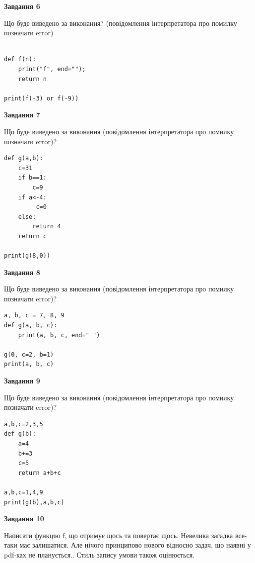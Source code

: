\documentclass[12pt, ukrainian]{article}
\begin{document}
{\begin {large}
{\begin {center}\textbf{Завдання 6}\end {center}}

Що буде виведено за виконання? (повідомлення інтерпретатора про помилку позначати error)\par
\begin{verbatim}

def f(n):
    print("f", end="");
    return n

print(f(-3) or f(-9))
\end{verbatim}

{\begin {center}\textbf{Завдання 7}\end {center}}

Що буде виведено за виконання (повідомлення інтерпретатора про помилку позначати error)?\par
\begin{verbatim}
def g(a,b):
    c=31
    if b==1:
        c=9
    if a<-4:
         c=0
    else: 
        return 4
    return c

print(g(8,0))
\end{verbatim}

{\begin {center}\textbf{Завдання 8}\end {center}}

Що буде виведено за виконання (повідомлення інтерпретатора про помилку позначати error)?\par
\begin{verbatim}
a, b, c = 7, 8, 9
def g(a, b, c):
    print(a, b, c, end=" ")

g(0, c=2, b=1)
print(a, b, c)
\end{verbatim}

{\begin {center}\textbf{Завдання 9}\end {center}}

Що буде виведено за виконання (повідомлення інтерпретатора про помилку позначати error)?\par
\begin{verbatim}
a,b,c=2,3,5
def g(b):
    a=4
    b+=3
    c=5
    return a+b+c

a,b,c=1,4,9
print(g(b),a,b,c)
\end{verbatim}

{\begin {center}\textbf{Завдання 10}\end {center}}


Написати функцiю f, що отримує щось та повертає щось. Невелика загадка все-таки має залишатися. Але нічого принципово нового відносно задач, що наявні у pdf-ках не планується.. Стиль запису умови також оцінюється.\par
\end {large}}
\newpage
\end{document}
